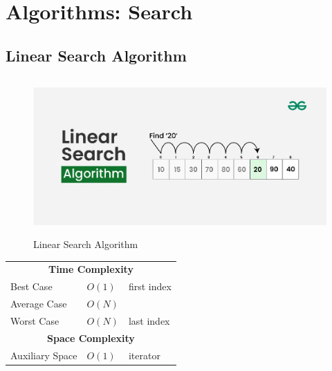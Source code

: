 \chapter{Algorithms: Search}

\section{Linear Search Algorithm \cite{gfg-linear-search}}\label{Linear Search Algorithm}

\begin{table}[h]
    \begin{minipage}[t]{0.5\linewidth}
        \begin{figure}[H]
            \centering
            \includegraphics[width=\linewidth,height=6cm,keepaspectratio]{Pictures/ds-algo/Linear-Search-algorithm.jpg}
            \caption{Linear Search Algorithm}
        \end{figure}
    \end{minipage}
    \hfill
    \begin{minipage}[t]{0.35\linewidth}
        \begin{table}[H]
            \begin{tabular}{l l p{4cm}}
                \multicolumn{3}{c}{\textbf{Time Complexity}} \\
                 Best Case & $O(1)$ & first index \\
                 Average Case & $O(N)$ &  \\
                 Worst Case & $O(N)$ & last index \\
                 \multicolumn{3}{c}{\textbf{Space Complexity}}\\
                 Auxiliary Space & $O(1)$ & iterator \\
            \end{tabular}
        \end{table}
    \end{minipage}
\end{table}

